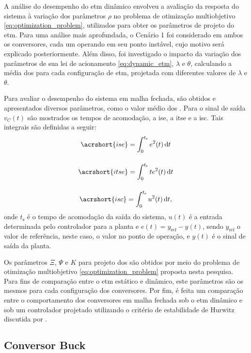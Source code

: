 A análise do desempenho do \acrshort{etm} dinâmico envolveu a avaliação da resposta do sistema à variação dos parâmetros $\rho$ no problema de otimização multiobjetivo \eqref{eq:optimization_problem}, utilizados para obter os parâmetros de projeto do \acrshort{etm}. Para uma análise mais aprofundada, o Cenário 1 foi considerado em ambos os conversores, cada um operando em seu ponto instável, cujo motivo será explicado posteriormente. Além disso, foi investigado o impacto da variação dos parâmetros de sua lei de acionamento \eqref{eq:dynamic_etm}, $\lambda$ e $\theta$, calculando a média dos  para cada configuração de \acrshort{etm}, projetada com diferentes valores de $\lambda$ e $\theta$.

Para avaliar o desempenho do sistema em malha fechada, são obtidos e apresentados diversos parâmetros, como o valor médio dos . Para o sinal de saída  $v_C(t)$ são mostrados os tempos de acomodação, a \acrfull{ise}, a \acrfull{itse} e a \acrfull{isc}. Tais integrais são definidas a seguir: \begin{gather}
  \acrshort{ise} = \int_0^{t_\mathrm{s}} e^2(t) \, \mathrm{d}t \\[12pt]
  \acrshort{itse} = \int_0^{t_\mathrm{s}} t e^2(t) \, \mathrm{d}t \\[12pt]
  \acrshort{isc} = \int_0^{t_\mathrm{s}} u^2(t) \, \mathrm{d}t,
\end{gather} onde $t_{\mathrm{s}}$ é o tempo de acomodação da saída do sistema, $u(t)$ é a entrada determinada pelo controlador para a planta e $e(t) = y_{\mathrm{ref}} - y(t)$, sendo $y_{\mathrm{ref}}$ o valor de referência, neste caso, o valor no ponto de operação, e $y(t)$ é o sinal de saída da planta.

Os parâmetros $\Xi$, $\Psi$ e $K$ para projeto dos  são obtidos por meio do problema de otimização multiobjetivo \eqref{eq:optimization_problem} proposta nesta pesquisa. Para fins de comparação entre o \acrshort{etm} estático e dinâmico, este parâmetros são os mesmos para cada configuração dos conversores. Por fim, é feita um comparação entre o comportamento dos conversores em malha fechada sob o \acrshort{etm} dinâmico e sob um controlador projetado utilizando o critério de estabilidade de Hurwitz discutida por \cite{Duan2013}.

\subsection{Conversor Buck}

